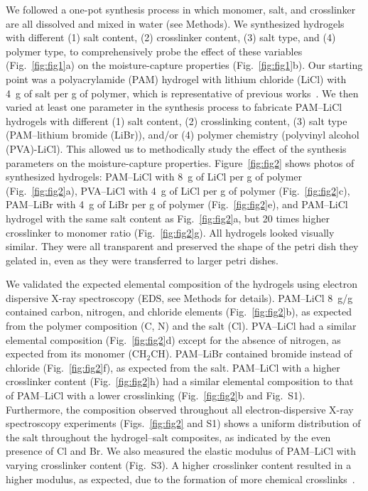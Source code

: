 \documentclass[11pt]{article}
\begin{document}
We followed a one-pot synthesis process in which monomer, salt, and crosslinker are all dissolved and mixed in water (see Methods). We synthesized hydrogels with different (1) salt content, (2) crosslinker content, (3) salt type, and (4) polymer type, to comprehensively probe the effect of these variables (Fig.~\ref{fig:fig1}a) on the moisture-capture properties (Fig.~\ref{fig:fig1}b). Our starting point was a polyacrylamide (PAM) hydrogel with lithium chloride (LiCl) with 4~g of salt per g of polymer, which is representative of previous works~\cite{graeber2023,lu2022}. We then varied at least one parameter in the synthesis process to fabricate PAM--LiCl hydrogels with different (1) salt content, (2) crosslinking content, (3) salt type (PAM--lithium bromide (LiBr)), and/or (4) polymer chemistry (polyvinyl alcohol (PVA)-LiCl). This allowed us to methodically study the effect of the synthesis parameters on the moisture-capture properties. Figure~\ref{fig:fig2} shows photos of synthesized hydrogels: PAM--LiCl with 8~g of LiCl per g of polymer (Fig.~\ref{fig:fig2}a), PVA--LiCl with 4~g of LiCl per g of polymer (Fig.~\ref{fig:fig2}c), PAM--LiBr with 4~g of LiBr per g of polymer (Fig.~\ref{fig:fig2}e), and PAM--LiCl hydrogel with the same salt content as Fig.~\ref{fig:fig2}a, but 20 times higher crosslinker to monomer ratio (Fig.~\ref{fig:fig2}g). All hydrogels looked visually similar. They were all transparent and preserved the shape of the petri dish they gelated in, even as they were transferred to larger petri dishes.

We validated the expected elemental composition of the hydrogels using electron dispersive X-ray spectroscopy (EDS, see Methods for details). PAM--LiCl 8~g/g contained carbon, nitrogen, and chloride elements (Fig.~\ref{fig:fig2}b), as expected from the polymer composition (C, N) and the salt (Cl). PVA--LiCl had a similar elemental composition (Fig.~\ref{fig:fig2}d) except for the absence of nitrogen, as expected from its monomer (CH$_2$CH). PAM--LiBr contained bromide instead of chloride (Fig.~\ref{fig:fig2}f), as expected from the salt. PAM--LiCl with a higher crosslinker content (Fig.~\ref{fig:fig2}h) had a similar elemental composition to that of PAM--LiCl with a lower crosslinking (Fig.~\ref{fig:fig2}b and Fig.~S1). Furthermore, the composition observed throughout all electron-dispersive X-ray spectroscopy experiments (Figs.~\ref{fig:fig2} and S1) shows a uniform distribution of the salt throughout the hydrogel--salt composites, as indicated by the even presence of Cl and Br. We also measured the elastic modulus of PAM--LiCl with varying crosslinker content (Fig.~S3). A higher crosslinker content resulted in a higher modulus, as expected, due to the formation of more chemical crosslinks~\cite{subramani2020}.
\end{document}
